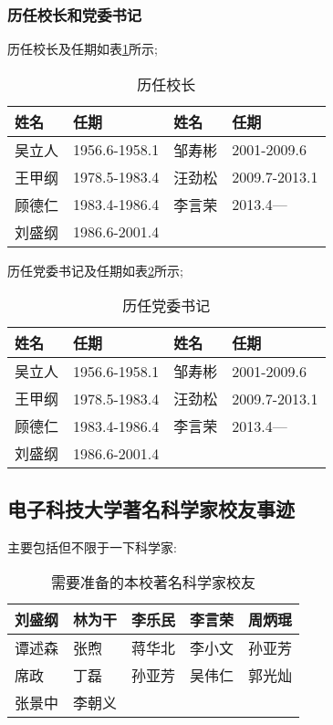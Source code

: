 \documentclass[UTF8]{ctexart}
\begin{document}
\subsubsection{历任校长和党委书记}
历任校长及任期如表\ref{xiaozhang}所示;
\begin{table}[h]
    \centering
    \begin{tabular}{@{}|l|l|l|l|@{}}
    \hline
    姓名 & 任期 & 姓名 & 任期 \\ \hline
    吴立人 & 1956.6-1958.1 & 邹寿彬 & 2001-2009.6 \\ \hline
    王甲纲 & 1978.5-1983.4 & 汪劲松 & 2009.7-2013.1 \\ \hline
    顾德仁 & 1983.4-1986.4 & 李言荣 & 2013.4— \\ \hline
    刘盛纲 & 1986.6-2001.4 &  &  \\ \hline
    \end{tabular}
    \caption{历任校长}
    \label{xiaozhang}
    \end{table}

历任党委书记及任期如表\ref{shuji}所示;
\begin{table}[htbp]
    \centering
    \begin{tabular}{@{}|l|l|l|l|@{}}
    \hline
    姓名 & 任期 & 姓名 & 任期 \\ \hline
    吴立人 & 1956.6-1958.1 & 邹寿彬 & 2001-2009.6 \\ \hline
    王甲纲 & 1978.5-1983.4 & 汪劲松 & 2009.7-2013.1 \\ \hline
    顾德仁 & 1983.4-1986.4 & 李言荣 & 2013.4— \\ \hline
    刘盛纲 & 1986.6-2001.4 &  &  \\ \hline
    \end{tabular}
    \caption{历任党委书记}
    \label{shuji}
    \end{table}


    \subsection{电子科技大学著名科学家校友事迹}
    主要包括但不限于一下科学家: 
    \begin{table}[h]
        \centering
        \begin{tabular}{|l|l|l|l|l|}
        \hline
        刘盛纲 & 林为干 & 李乐民 & 李言荣 & 周炳琨 \\ \hline
        谭述森 & 张煦 & 蒋华北 & 李小文 & 孙亚芳 \\ \hline
        席政 & 丁磊 & 孙亚芳 & 吴伟仁 & 郭光灿 \\ \hline
        张景中 & 李朝义 &  &  &  \\ \hline
        \end{tabular}
        \caption{需要准备的本校著名科学家校友}
        \label{my-label}
        \end{table}
\end{document}
